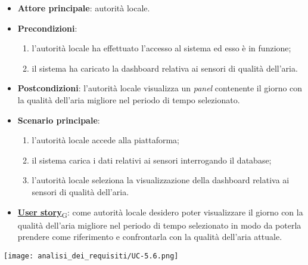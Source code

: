 \begin{itemize}
	\item \textbf{Attore principale}: autorità locale.
	\item \textbf{Precondizioni}:
	      \begin{enumerate}
		      \item l'autorità locale ha effettuato l'accesso al sistema ed esso è in funzione;
		      \item il sistema ha caricato la dashboard relativa ai sensori di qualità dell'aria.
	      \end{enumerate}
	\item \textbf{Postcondizioni}: l'autorità locale visualizza un \textit{panel} contenente il giorno con la qualità dell'aria migliore nel periodo di tempo selezionato.
	\item \textbf{Scenario principale}:
	      \begin{enumerate}
		      \item l'autorità locale accede alla piattaforma;
		      \item il sistema carica i dati relativi ai sensori interrogando il database;
		      \item l'autorità locale seleziona la visualizzazione della dashboard relativa ai sensori di qualità dell'aria.
	      \end{enumerate}
	\item \href{https://7last.github.io/docs/rtb/documentazione-interna/glossario\#user-story}{\textbf{User story}\textsubscript{G}}:
	      come autorità locale desidero poter visualizzare il giorno con la qualità dell'aria migliore nel periodo di tempo selezionato
	      in modo da poterla prendere come riferimento e confrontarla con la qualità dell'aria attuale.
\end{itemize}
\begin{center}
	\texttt{[image: analisi\_dei\_requisiti/UC-5.6.png]}
\end{center}

